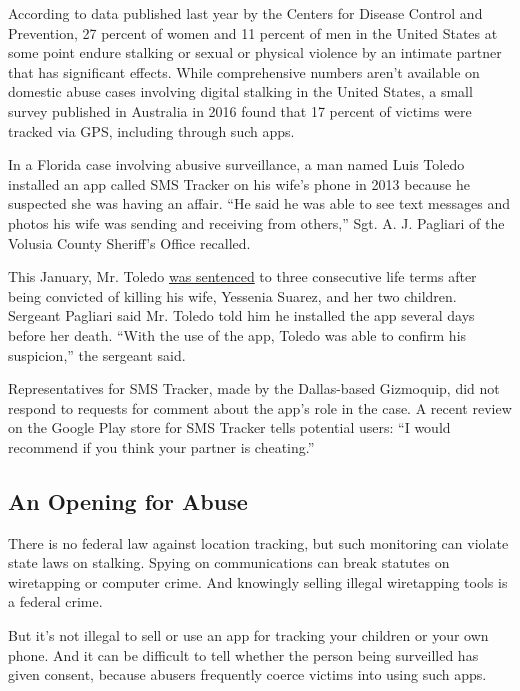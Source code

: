 According to data published last year by the Centers for Disease Control
and Prevention, 27 percent of women and 11 percent of men in the United
States at some point endure stalking or sexual or physical violence by
an intimate partner that has significant effects. While comprehensive
numbers aren't available on domestic abuse cases involving digital
stalking in the United States, a small survey published in Australia in
2016 found that 17 percent of victims were tracked via GPS, including
through such apps.

In a Florida case involving abusive surveillance, a man named Luis
Toledo installed an app called SMS Tracker on his wife's phone in 2013
because he suspected she was having an affair. ``He said he was able to
see text messages and photos his wife was sending and receiving from
others,'' Sgt. A. J. Pagliari of the Volusia County Sheriff's Office
recalled.

This January, Mr. Toledo
\href{http://www.news-journalonline.com/news/20180119/luis-toledo-gets-3-consecutive-life-sentences-for-murders-of-wife-her-2-children}{was
sentenced} to three consecutive life terms after being convicted of
killing his wife, Yessenia Suarez, and her two children. Sergeant
Pagliari said Mr. Toledo told him he installed the app several days
before her death. ``With the use of the app, Toledo was able to confirm
his suspicion,'' the sergeant said.

Representatives for SMS Tracker, made by the Dallas-based Gizmoquip, did
not respond to requests for comment about the app's role in the case. A
recent review on the Google Play store for SMS Tracker tells potential
users: ``I would recommend if you think your partner is cheating.''

\hypertarget{an-opening-for-abuse}{%
\subsection{An Opening for Abuse}\label{an-opening-for-abuse}}

There is no federal law against location tracking, but such monitoring
can violate state laws on stalking. Spying on communications can break
statutes on wiretapping or computer crime. And knowingly selling illegal
wiretapping tools is a federal crime.

But it's not illegal to sell or use an app for tracking your children or
your own phone. And it can be difficult to tell whether the person being
surveilled has given consent, because abusers frequently coerce victims
into using such apps.

